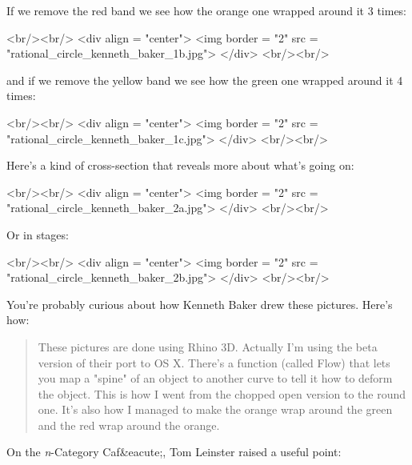 If we remove the red band we see how the orange one wrapped around
it 3 times:

<br/><br/>
<div align = "center">
<img border = "2" src = "rational_circle_kenneth_baker_1b.jpg">
</div>
<br/><br/>

and if we remove the yellow band we see how the green one wrapped
around it 4 times:

<br/><br/>
<div align = "center">
<img border = "2" src = "rational_circle_kenneth_baker_1c.jpg">
</div>
<br/><br/>

Here's a kind of cross-section that reveals more about what's going
on:

<br/><br/>
<div align = "center">
<img border = "2" src = "rational_circle_kenneth_baker_2a.jpg">
</div>
<br/><br/>

Or in stages:

<br/><br/>
<div align = "center">
<img border = "2" src = "rational_circle_kenneth_baker_2b.jpg">
</div>
<br/><br/>

You're probably curious about how Kenneth Baker drew these pictures.
Here's how:

\begin{quote}

These pictures are done using Rhino 3D. Actually I'm using the beta
version of their port to OS X. There's a function (called Flow) that
lets you map a "spine" of an object to another curve to tell it how to
deform the object. This is how I went from the chopped open version to
the round one. It's also how I managed to make the orange wrap around
the green and the red wrap around the orange.

\end{quote}
    

On the \emph{n}-Category Caf&eacute;, Tom Leinster raised a useful point:




